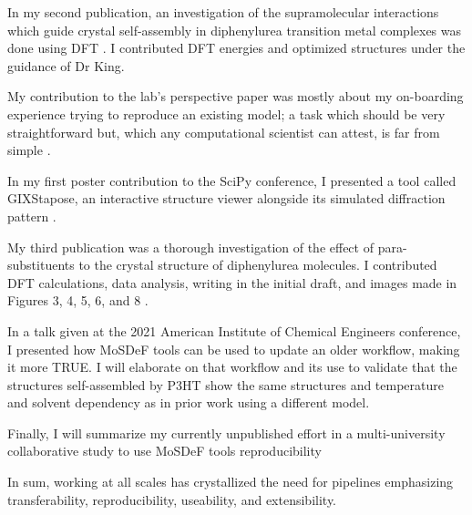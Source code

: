 In my second publication, an investigation of the supramolecular interactions which guide crystal self-assembly in diphenylurea transition metal complexes was done using DFT \cite{Millard2019a}.
I contributed DFT energies and optimized structures under the guidance of Dr King.

My contribution to the lab's perspective paper was mostly about my on-boarding experience trying to reproduce an existing model; a task which should be very straightforward but, which any computational scientist can attest, is far from simple \cite{Jankowski2019}.

In my first poster contribution to the SciPy conference, I presented a tool called GIXStapose, an interactive structure viewer alongside its simulated diffraction pattern \cite{gixstapose, scipy2020}.

My third publication was a thorough investigation of the effect of para-substituents to the crystal structure of diphenylurea molecules. I contributed DFT calculations, data analysis, writing in the initial draft, and images made in Figures 3, 4, 5, 6, and 8 \cite{Fothergill2021}.

In a talk given at the 2021 American Institute of Chemical Engineers conference, I presented how MoSDeF tools can be used to update an older workflow, making it more TRUE. 
I will elaborate on that workflow and its use to validate that the structures self-assembled by P3HT show the same structures and temperature and solvent dependency as in prior work using a different model.

Finally, I will summarize my currently unpublished effort in a multi-university collaborative study to use MoSDeF tools reproducibility

In sum, working at all scales has crystallized the need for pipelines emphasizing transferability, reproducibility, useability, and extensibility.

